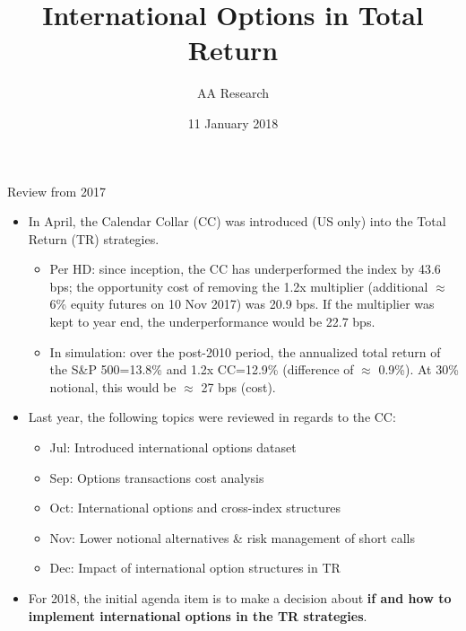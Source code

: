 \documentclass{beamer}
\title[International Options in Total Return]{International Options in Total Return}
\author[ AA Research ]{ AA Research }
\date{11 January 2018}
\begin{document}
\begin{frame}
  \titlepage
\end{frame}

\begin{frame}{Review from 2017}

\begin{itemize}

\item In April, the Calendar Collar (CC) was introduced (US only) into the Total Return (TR) strategies. 
	\begin{itemize}
	\item Per HD: since inception, the CC has underperformed the index by 43.6 bps; the opportunity cost of removing the 1.2x multiplier (additional $\approx$ 6\% equity futures on 10 Nov 2017) was 20.9 bps. If the multiplier was kept to year end, the underperformance would be 22.7 bps.
	\item In simulation: over the post-2010 period, the annualized total return of the S\&P 500=13.8\% and 1.2x CC=12.9\% (difference of $\approx$ 0.9\%). At 30\% notional, this would be $\approx$ 27 bps (cost).
	\end{itemize}
\vfill
\item Last year, the following topics were reviewed in regards to the CC:
	\begin{itemize}
	\item Jul: Introduced international options dataset
	\item Sep: Options transactions cost analysis
	\item Oct: International options and cross-index structures
	\item Nov: Lower notional alternatives \& risk management of short calls
	\item Dec: Impact of international option structures in TR
	\end{itemize}
	
\vfill

\item For 2018, the initial agenda item is to make a decision about {\bf if and how to implement international options in the TR strategies}.

\end{itemize}

\end{frame}
\end{document}
